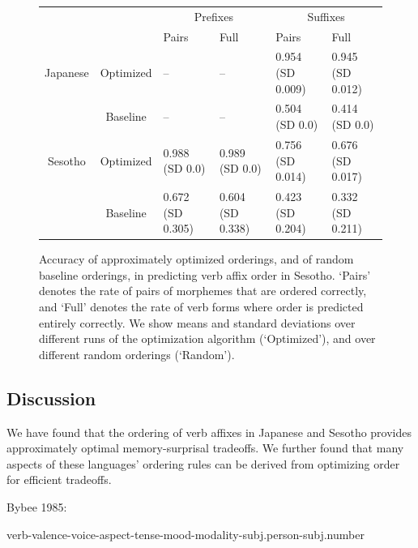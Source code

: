 \begin{figure}
\begin{tabular}{cc||ll|ll}
             &              & \multicolumn{2}{c}{Prefixes}    & \multicolumn{2}{|c}{Suffixes} \\
             &              & Pairs & Full & Pairs & Full \\ \hline\hline
Japanese & Optimized  & -- &  -- &   0.954 (SD 0.009) & 0.945 (SD 0.012) \\ 
& Baseline    & -- & -- & 0.504 (SD 0.0) & 0.414 (SD 0.0) \\ \hline
Sesotho &   Optimized  &  0.988 (SD 0.0) & 0.989 (SD 0.0) & 0.756 (SD 0.014) & 0.676 (SD 0.017) \\
&   Baseline  &  0.672 (SD 0.305) & 0.604 (SD 0.338) & 0.423 (SD 0.204) & 0.332 (SD 0.211) \\ 
\end{tabular}
\caption{Accuracy of approximately optimized orderings, and of random baseline orderings, in predicting verb affix order in Sesotho. `Pairs' denotes the rate of pairs of morphemes that are ordered correctly, and `Full' denotes the rate of verb forms where order is predicted entirely correctly. We show means and standard deviations over different runs of the optimization algorithm (`Optimized'), and over different random orderings (`Random').}\label{fig:morph-acc}
\end{figure}

\subsection{Discussion}
We have found that the ordering of verb affixes in Japanese and Sesotho provides approximately optimal memory-surprisal tradeoffs.
We further found that many aspects of these languages' ordering rules can be derived from optimizing order for efficient tradeoffs.

Bybee 1985:

verb-valence-voice-aspect-tense-mood-modality-subj.person-subj.number



